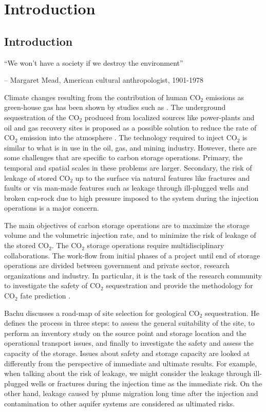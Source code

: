 \chapter{Introduction}
%
 \pagebreak

\section{Introduction}
\label{sec:Introduction}
``We won’t have a society if we destroy the environment''

\small{-- Margaret Mead,  American cultural anthropologist, 1901-1978}
\vspace{2.5cm} 

Climate changes resulting from the contribution of human $\mbox{CO}_2$ emissions as green-house gas has been shown by studies such as \cite{houghton2001climate}. The
underground sequestration of the $\mbox{CO}_2$ produced from localized sources
like power-plants and oil and gas recovery sites is proposed as a possible
solution to reduce the rate of $\mbox{CO}_2$ emission into the atmosphere
\cite{hitchon1999sedimentary,bradshaw2001geological}. The technology
required to inject $\mbox{CO}_2$ is similar to what is in use in the oil, gas, and mining
industry. However, there are some challenges that are specific to carbon storage
operations. Primary, the temporal and spatial scales in these problems are larger.
Secondary, the risk of leakage of stored $\mbox{CO}_2$ up to the surface via
natural features like fractures and faults or via man-made features such as
leakage through ill-plugged wells and broken cap-rock due to high pressure
imposed to the system during the injection operations is a major concern. 

The main objectives of carbon storage operations are to maximize the storage
volume and the volumetric injection rate, and to minimize the risk of leakage of
the stored $\mbox{CO}_2$. The $\mbox{CO}_2$ storage operations require multidisciplinary collaborations. The work-flow from initial phases of a project
until end of storage operations are divided between government and private
sector, research organizations and industry. In particular, it is the task of the research
community to investigate the safety of $\mbox{CO}_2$ sequestration and provide
the methodology for $\mbox{CO}_2$ fate prediction \cite{bachu2000sequestration}.

Bachu \cite{bachu2000sequestration} discusses a road-map of site selection for
geological $\mbox{CO}_2$ sequestration. He defines the process in three steps:
to assess the general suitability of the site, to perform an inventory study on
the source point and storage location and the operational transport issues, and
finally to investigate the safety and assess the capacity of the storage. Issues
about safety and storage capacity are looked at differently from the perspective
of immediate and ultimate results. For example, when talking about the risk of
leakage, we might consider the leakage through ill-plugged wells or fractures
during the injection time as the immediate risk. On the other hand, leakage
caused by plume migration long time after the injection and contamination to
other aquifer systems are considered as ultimated risks. 

